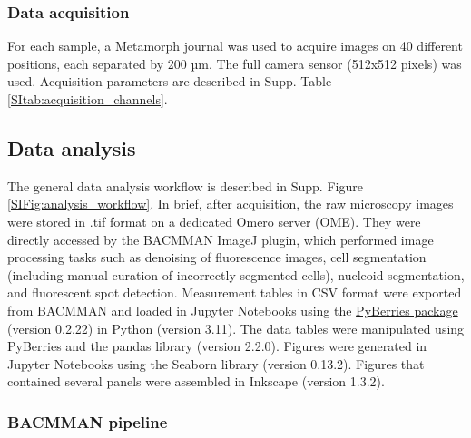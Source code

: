 \subsubsection*{Data acquisition}
For each sample, a Metamorph journal was used to acquire images on 40 different positions, each separated by 200 µm. The full camera sensor (512x512 pixels) was used. Acquisition parameters are described in Supp. Table \ref{SItab:acquisition_channels}.

\subsection*{Data analysis}
The general data analysis workflow is described in Supp. Figure \ref{SIFig:analysis_workflow}. In brief, after acquisition, the raw microscopy images were stored in .tif format on a dedicated Omero server (OME). They were directly accessed by the BACMMAN ImageJ plugin\cite{Ollion2019}, which performed image processing tasks such as denoising of fluorescence images, cell segmentation (including manual curation of incorrectly segmented cells), nucleoid segmentation, and fluorescent spot detection. Measurement tables in CSV format were exported from BACMMAN and loaded in Jupyter Notebooks using the \href{https://gitlab.com/MEKlab/pyberries}{PyBerries package} (version 0.2.22) in Python (version 3.11). The data tables were manipulated using PyBerries and the pandas library (version 2.2.0). Figures were generated in Jupyter Notebooks using the Seaborn library (version 0.13.2). Figures that contained several panels were assembled in Inkscape (version 1.3.2).

\subsubsection*{BACMMAN pipeline}
